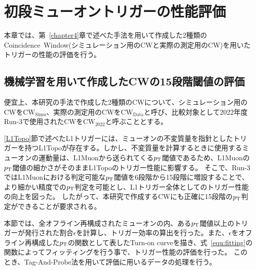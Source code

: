 \chapter{初段ミューオントリガーの性能評価}\label{chapter5}
本章では、第~\ref{chapter4}章で述べた手法を用いて作成した2種類のCoincidence~Window(シミュレーション用のCWと実際の測定用のCW)を用いたトリガーの性能の評価を行う。

\section{機械学習を用いて作成したCWの15段階閾値の評価}
便宜上、本研究の手法で作成した2種類のCWについて、シミュレーション用のCWを$\mathrm{CW_{Simu}}$、実際の測定用のCWを$\mathrm{CW_{Data}}$と呼び、比較対象として2022年度Run-3で使用されたCWを$\mathrm{CW_{2022}}$と呼ぶこととする。

\ref{L1Topo}節で述べたL1トリガーには、ミューオンの不変質量を指針としたトリガーを持つL1Topoが存在する。しかし、不変質量を計算するときに使用するミューオンの運動量は、L1Muonから送られてくる$p_{\rm{T}}$閾値であるため、L1Muonの$p_{\rm{T}}$閾値の細かさがそのままL1Topoのトリガー性能に影響する。
そこで、Run-3ではL1Muonにおける判定可能な$p_{\rm{T}}$閾値を6段階から15段階に増設することで、より細かい精度での$p_{\rm{T}}$判定を可能とし、L1トリガー全体としてのトリガー性能の向上を図った。
したがって、本研究で作成するCWにも正確に15段階の$p_{\rm{T}}$判定ができることが要求される。

本節では、全オフライン再構成されたミューオンの内、ある$p_{\rm{T}}$閾値以上のトリガーが発行された割合$\epsilon$を計算し、トリガー効率の算出を行った。また、$\epsilon$をオフライン再構成した$p_{\rm{T}}$の関数として表したTurn-on curveを描き、式~\eqref{equ:fitting}の関数によってフィッティングを行う事で、トリガー性能の評価を行った。
このとき、Tag-And-Probe法を用いて評価に用いるデータの処理を行う。

